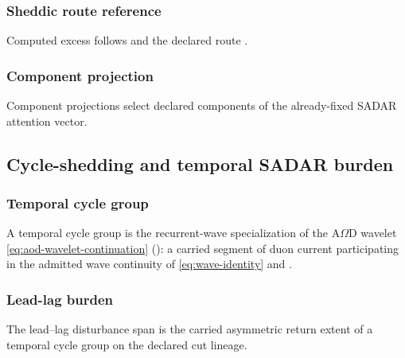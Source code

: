 \subsubsection{Sheddic route reference}\label{subsec:sadar-sheddic-route-reference}
Computed excess follows  and the declared route
.

\subsubsection{Component projection}\label{subsec:component-projection}
Component projections select declared components of the already-fixed SADAR attention vector.


\subsection{Cycle-shedding and temporal SADAR burden}\label{sec:cycle-shedding-temporal-sadar-burden}

\subsubsection{Temporal cycle group}\label{subsec:temporal-cycle-group}
\begin{definition}
A temporal cycle group is the recurrent-wave specialization of the A\(\Omega\)D wavelet \eqref{eq:aod-wavelet-continuation} (): a carried segment of duon current participating in the admitted wave continuity of \eqref{eq:wave-identity} and .
\end{definition}

\subsubsection{Lead-lag burden}\label{subsec:lead-lag-burden}
\begin{definition}
The lead--lag disturbance span is the carried asymmetric return extent of a temporal cycle group on the declared cut lineage.
\end{definition}

